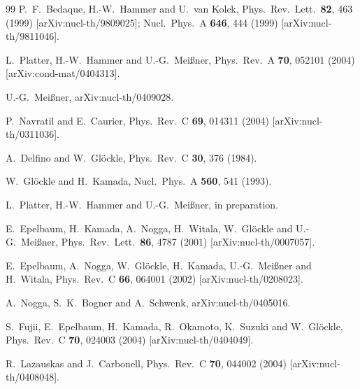 \documentclass[prc,preprint,tightenlines,showpacs]{revtex4}
\begin{document}
\begin{thebibliography}{99}
P.~F.~Bedaque, H.-W.~Hammer and U.~van Kolck,
Phys.\ Rev.\ Lett.\  {\bf 82}, 463 (1999)
[arXiv:nucl-th/9809025];
Nucl.\ Phys.\ A {\bf 646}, 444 (1999)
[arXiv:nucl-th/9811046].


L.~Platter, H.-W.~Hammer and U.-G.~Mei\ss ner,
Phys.\ Rev.\ A {\bf 70}, 052101 (2004)
[arXiv:cond-mat/0404313].

U.-G.~Mei{\ss}ner,
arXiv:nucl-th/0409028.


P.~Navratil and E.~Caurier,
Phys.\ Rev.\ C {\bf 69}, 014311 (2004)
[arXiv:nucl-th/0311036].


A.~Delfino and W.~Gl\"ockle,
Phys.\ Rev.\ C {\bf 30}, 376 (1984).

W.~Gl\"ockle and H.~Kamada,
Nucl.\ Phys.\ A {\bf 560}, 541 (1993).


L.~Platter, H.-W.~Hammer and U.-G.~Mei\ss ner,
in preparation.

E.~Epelbaum, H.~Kamada, A.~Nogga, H.~Witala, W.~Gl\"ockle and U.-G.~Mei\ss ner,
Phys.\ Rev.\ Lett.\  {\bf 86}, 4787 (2001)
[arXiv:nucl-th/0007057].

E.~Epelbaum, A.~Nogga, W.~Gl\"ockle, H.~Kamada, U.-G.~Mei\ss ner and H.~Witala,
Phys.\ Rev.\ C {\bf 66}, 064001 (2002)
[arXiv:nucl-th/0208023].

A.~Nogga, S.~K.~Bogner and A.~Schwenk,
arXiv:nucl-th/0405016.

S.~Fujii, E.~Epelbaum, H.~Kamada, R.~Okamoto, K.~Suzuki and W.~Gl\"ockle,
Phys.\ Rev.\ C {\bf 70}, 024003 (2004)
[arXiv:nucl-th/0404049].

R.~Lazauskas and J.~Carbonell,
Phys.\ Rev.\ C {\bf 70}, 044002 (2004)
[arXiv:nucl-th/0408048].

\end{thebibliography}
\end{document}
